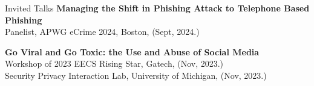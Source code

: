 \documentclass[12pt]{resume}
\begin{document}

\medskip

\begin{rSection}{Invited Talks}
\textbf{Managing the Shift in Phishing Attack to Telephone Based Phishing}\\
Panelist, APWG eCrime 2024, Boston, (Sept, 2024.)\\ 

\item 
\textbf{Go Viral and Go Toxic: the Use and Abuse of Social Media }\\
Workshop of 2023 EECS Rising Star, Gatech, (Nov, 2023.)\\
Security Privacy Interaction Lab, University of Michigan, (Nov, 2023.)\\
\item 



\end{rSection}
\end{document}
